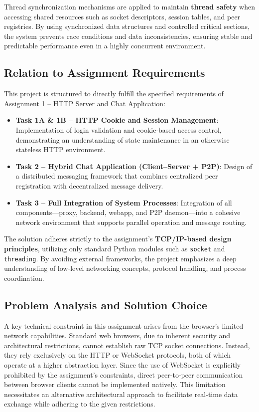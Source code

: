 Thread synchronization mechanisms are applied to maintain \textbf{thread safety} when accessing shared resources such as socket descriptors, session tables, and peer registries. By using synchronized data structures and controlled critical sections, the system prevents race conditions and data inconsistencies, ensuring stable and predictable performance even in a highly concurrent environment.

\subsection{Relation to Assignment Requirements}
This project is structured to directly fulfill the specified requirements of Assignment 1 – HTTP Server and Chat Application:

\begin{itemize}
\item \textbf{Task 1A \& 1B – HTTP Cookie and Session Management}: Implementation of login validation and cookie-based access control, demonstrating an understanding of state maintenance in an otherwise stateless HTTP environment.
\item \textbf{Task 2 – Hybrid Chat Application (Client–Server + P2P)}: Design of a distributed messaging framework that combines centralized peer registration with decentralized message delivery.
\item \textbf{Task 3 – Full Integration of System Processes}: Integration of all components—proxy, backend, webapp, and P2P daemon—into a cohesive network environment that supports parallel operation and message routing.
\end{itemize}

The solution adheres strictly to the assignment’s \textbf{TCP/IP-based design principles}, utilizing only standard Python modules such as \texttt{socket} and \texttt{threading}. By avoiding external frameworks, the project emphasizes a deep understanding of low-level networking concepts, protocol handling, and process coordination.

\subsection{Problem Analysis and Solution Choice}
A key technical constraint in this assignment arises from the browser’s limited network capabilities. Standard web browsers, due to inherent security and architectural restrictions, cannot establish raw TCP socket connections. Instead, they rely exclusively on the HTTP or WebSocket protocols, both of which operate at a higher abstraction layer. Since the use of WebSocket is explicitly prohibited by the assignment’s constraints, direct peer-to-peer communication between browser clients cannot be implemented natively. This limitation necessitates an alternative architectural approach to facilitate real-time data exchange while adhering to the given restrictions.

